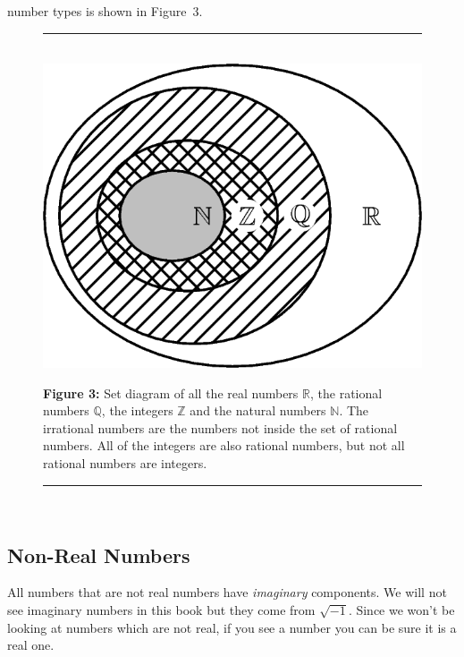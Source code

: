number types is shown in Figure~3.\par 
    \setcounter{subfigure}{0}
	\begin{figure}[H] %
    \begin{center}
    \rule[.1in]{\figurerulewidth}{.005in} \\
        \label{m38346*uid53!!!underscore!!!media}\label{m38346*uid53!!!underscore!!!printimage}\includegraphics{col11306.imgs/m38346_MG10C2_003.png} %
      \vspace{2pt}
    \vspace{\rubberspace}\par \begin{cnxcaption}
	  \small \textbf{Figure 3: }Set diagram of all the real numbers $\mathbb{R}$, the rational
numbers $\mathbb{Q}$, the integers $\mathbb{Z}$ and the natural numbers $\mathbb{N}$. The irrational numbers are the numbers not inside the set of rational
numbers. All of the integers are also rational numbers, but not all rational
numbers are integers.
	\end{cnxcaption}
    \vspace{.1in}
    \rule[.1in]{\figurerulewidth}{.005in} \\
    \end{center}
 \end{figure}       
\label{m38346*secfhsst!!!underscore!!!id2036}
            \subsection{  Non-Real Numbers }
            \nopagebreak
      \label{m38346*id178383}All numbers that are not real numbers have
\textsl{imaginary} components. We will not see imaginary numbers in this book
but they come from $\sqrt{-1}$. Since we won't be looking at
numbers which are not real, if you see a number you can be sure it is a real
one. \par 
      \label{m38346*uid54}
